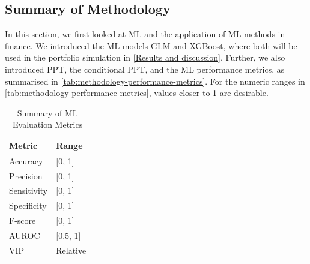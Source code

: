 \subsection{Summary of Methodology}

In this section, we first looked at ML and the application of ML methods in finance. We introduced the ML models GLM and XGBoost, where both will be used in the portfolio simulation in \autoref{Results and discussion}.  Further, we also introduced PPT, the conditional PPT, and the ML performance metrics, as summarised in \autoref{tab:methodology-performance-metrics}. For the numeric ranges in \autoref{tab:methodology-performance-metrics}, values closer to 1 are desirable. 

\begin{table}[H]
\centering
\begin{tabularx}{0.5\textwidth}{XX}
\hline
Metric       & Range \\
\hline
Accuracy              & [0, 1] \\
Precision             & [0, 1] \\
Sensitivity           & [0, 1] \\
Specificity           & [0, 1] \\
F-score               & [0, 1] \\
AUROC                 & [0.5, 1] \\
VIP & Relative \\
\hline
\end{tabularx}
\vspace{1em}
\caption{{Summary of ML Evaluation Metrics}}
\label{tab:methodology-performance-metrics}
\end{table}

